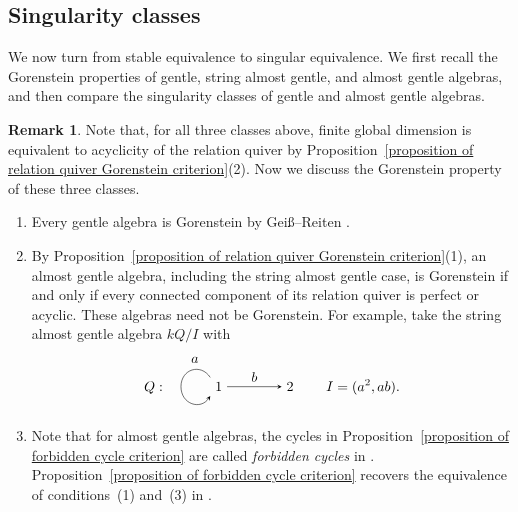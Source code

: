 \documentclass[11pt]{article}
\theoremstyle{definition}
\newtheorem{remark}[theorem]{Remark}
\begin{document}
	\subsection{{Singularity classes}}

		We now turn from stable equivalence to singular equivalence.
		We first recall the Gorenstein properties of gentle, string almost gentle, and almost gentle algebras, and then compare the singularity classes of gentle and almost gentle algebras.


		\begin{remark}\label{remark of three classes Gorenstein}
			Note that, for all three classes above, finite global dimension is equivalent to acyclicity of the relation quiver by Proposition~\ref{proposition of relation quiver Gorenstein criterion}(2). Now we discuss the Gorenstein property of these three classes.
			\begin{enumerate}
				\item
				Every gentle algebra is Gorenstein by Gei\ss{}--Reiten 	\cite[Theorem~3.4]{GR05}.

				\item
				By Proposition~\ref{proposition of relation quiver Gorenstein criterion}(1), 	an almost gentle algebra, including the string almost gentle case, is Gorenstein if and only if every connected component of its	relation quiver is perfect or acyclic. These algebras need not be Gorenstein.
				For example, take the string almost gentle algebra $kQ/I$ with 
				\[
					Q:\quad
					\begin{tikzpicture}[baseline=(v1.base),>=stealth]
						\node (v1) at (0,0) {$1$};
						\node (v2) at (1.8,0) {$2$};
						\draw[->] (v1.north west)
							.. controls (-.45,.60) and (-.95,.45) .. (-.95,0)
							.. controls (-.95,-.45) and (-.45,-.60) .. (v1.south west);
						\node[above] at (-.60,.48) {$a$};
						\draw[->] (v1) -- node[above] {$b$} (v2);
					\end{tikzpicture}
					\qquad I=(a^2,ab).
				\]

				\item Note that for almost gentle algebras, the cycles in Proposition~\ref{proposition of forbidden cycle criterion} are called \emph{forbidden cycles} in \cite{WHL25}. Proposition~\ref{proposition of forbidden cycle criterion} recovers the equivalence of conditions~(1) and~(3)
				in \cite[Theorem~1.3]{WHL25}.
			\end{enumerate}
		\end{remark}
\end{document}
